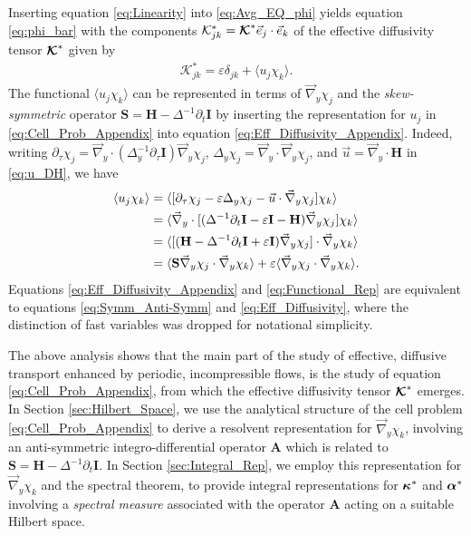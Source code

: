 \documentclass[11pt]{amsart}
\newcommand{\Hb}{\mathbf{H}}
\newcommand{\Ib}{\mathbf{I}}
\newcommand{\Sb}{\mathbf{S}}
\newcommand{\Ab}{\mathbf{A}}
\newcommand{\Kc}{\mathcal{K}}
\newcommand\Kbc{\mbox{\boldmath${\mathcal{K}}$}}
\newcommand\balpha{\mbox{\boldmath${\alpha}$}}
\newcommand\bkappa{\mbox{\boldmath${\kappa}$}}
\begin{document}
Inserting equation \eqref{eq:Linearity} into \eqref{eq:Avg_EQ_phi}
yields equation \eqref{eq:phi_bar} with the components
$\Kc^*_{jk}=\Kbc^*\vec{e}_j\cdot\vec{e}_k$ of the effective diffusivity
tensor $\Kbc^*$ given by 
%
\begin{align}\label{eq:Eff_Diffusivity_Appendix}
  \Kc^*_{jk}=\varepsilon\delta_{jk}+\langle u_j\chi_k\rangle.
\end{align}
%
The functional $\langle u_j\chi_k\rangle$ can
be represented in terms of $\vec{\nabla}_y\chi_j$ and the \emph{skew-symmetric}
operator $\Sb=\Hb-\Delta^{-1}\partial_t\Ib$ by inserting the representation for
$u_j$ in \eqref{eq:Cell_Prob_Appendix} into equation
\eqref{eq:Eff_Diffusivity_Appendix}. Indeed, writing 
$\partial_\tau\chi_j=\vec{\nabla}_y\cdot(\Delta_y^{-1}\partial_\tau\Ib)\vec{\nabla}_y\chi_j$,
$\Delta_y\chi_j=\vec{\nabla}_y\cdot\vec{\nabla}_y\chi_j$, and $\vec{u}=\vec{\nabla}_y\cdot\Hb$ in
\eqref{eq:u_DH}, we have   
%
\begin{align}\label{eq:Functional_Rep}
  \langle u_j\chi_k\rangle&=\langle[\partial_\tau\chi_j-\varepsilon\Delta_y\chi_j-\vec{u}\cdot\vec{\nabla}_y\chi_j]\chi_k\rangle
       \\
       &=\langle\vec{\nabla}_y\cdot[(\Delta^{-1}\partial_t\Ib-\varepsilon\Ib-\Hb)\vec{\nabla}_y\chi_j]\chi_k\rangle
       \notag\\
       &=\langle[(\Hb-\Delta^{-1}\partial_t\Ib+\varepsilon\Ib)\vec{\nabla}_y\chi_j]\cdot\vec{\nabla}_y\chi_k\rangle
       \notag\\
       &=\langle\Sb\vec{\nabla}_y\chi_j\cdot\vec{\nabla}_y\chi_k\rangle+\varepsilon\langle\vec{\nabla}_y\chi_j\cdot\vec{\nabla}_y\chi_k\rangle.
       \notag
\end{align}
%
Equations \eqref{eq:Eff_Diffusivity_Appendix} and
\eqref{eq:Functional_Rep} are equivalent to equations
\eqref{eq:Symm_Anti-Symm} and \eqref{eq:Eff_Diffusivity}, where the
distinction of fast variables was dropped for notational simplicity.





The above analysis shows that the main part of the study of effective, 
diffusive transport enhanced by periodic, incompressible flows, is the
study of equation \eqref{eq:Cell_Prob_Appendix}, from which the
effective diffusivity tensor $\Kbc^*$ emerges. In Section
\ref{sec:Hilbert_Space}, we use the analytical structure of the cell
problem \eqref{eq:Cell_Prob_Appendix} to derive a resolvent
representation for $\vec{\nabla}_y\chi_k$, involving an anti-symmetric
integro-differential operator $\Ab$ which is related to 
$\Sb=\Hb-\Delta^{-1}\partial_t\Ib$. In Section \ref{sec:Integral_Rep}, 
we employ this representation for $\vec{\nabla}_y\chi_k$ and the spectral
theorem, to provide integral representations for $\bkappa^*$ and
$\balpha^*$ involving a \emph{spectral measure} associated with the
operator $\Ab$ acting on a suitable Hilbert space.     
   
\end{document}
